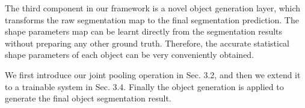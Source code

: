 \documentclass[10pt,twocolumn,letterpaper]{article}
\begin{document}

The third component in our framework is a novel object generation layer, which transforms the raw segmentation map to the final segmentation prediction.
The shape parameters map can be learnt directly from the segmentation results without preparing any other ground truth.
Therefore, the accurate statistical shape parameters of each object can be very conveniently obtained.


We first introduce our joint pooling operation in Sec. 3.2, and then we extend it to a trainable system in Sec. 3.4.
Finally the object generation is applied to generate the final object segmentation result.
\end{document}
